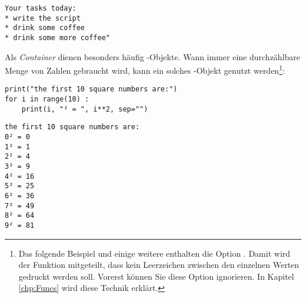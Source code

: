 \begin{cmdbox}
\begin{verbatim}
Your tasks today:
* write the script
* drink some coffee
* drink some more coffee"
\end{verbatim}
\end{cmdbox}

Als \emph{Container} dienen besonders häufig -Objekte. Wann immer eine durchzählbare Menge von Zahlen gebraucht wird, kann ein solches -Objekt genutzt werden\footnote{Das folgende Beispiel und einige weitere enthalten die Option . Damit wird der Funktion  mitgeteilt, dass kein Leerzeichen zwischen den einzelnen Werten gedruckt werden soll. Vorerst können Sie diese Option ignorieren. In Kapitel \ref{chp:Funcs} wird diese Technik erklärt.}:

\begin{codebox}
\begin{verbatim}
print("the first 10 square numbers are:")
for i in range(10) :
    print(i, "² = ", i**2, sep="")
\end{verbatim}
\end{codebox}

\begin{cmdbox}
\begin{verbatim}
the first 10 square numbers are:
0² = 0
1² = 1
2² = 4
3² = 9
4² = 16
5² = 25
6² = 36
7² = 49
8² = 64
9² = 81
\end{verbatim}
\end{cmdbox}

